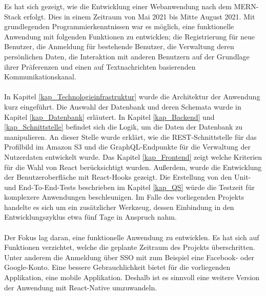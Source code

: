 Es hat sich gezeigt, wie die Entwicklung einer Webanwendung nach dem MERN-Stack erfolgt. Dies in einem Zeitraum von Mai 2021 bis Mitte August 2021. Mit grundlegenden Programmierkenntnissen war es möglich, eine funktionelle Anwendung mit folgenden Funktionen zu entwicklen; die Registrierung für neue Benutzer, die Anmeldung für bestehende Benutzer, die Verwaltung deren persönlichen Daten, die Interaktion mit anderen Benutzern auf der Grundlage ihrer Präferenzen und einen auf Textnachrichten basierenden Kommunikationskanal.
\\\\
In Kapitel \ref{kap_Technologieinfrastruktur} wurde die Architektur der Anwendung kurz eingeführt. %
Die Auswahl der Datenbank und deren Schemata wurde in Kapitel \ref{kap_Datenbank} erläutert. In Kapitel \ref{kap_Backend} und \ref{kap_Schnittstelle} befindet sich die Logik, um die Daten der Datenbank zu manipulieren. An dieser Stelle wurde erklärt, wie die REST-Schnittstelle für das Profilbild im Amazon S3 und die GraphQL-Endpunkte für die Verwaltung der Nutzerdaten entwickelt wurde.  
Das Kapitel \ref{kap_Frontend} zeigt welche Kriterien für die Wahl von React berücksichtigt wurden. Außerdem, wurde die Entwicklung der Benutzeroberfläche mit React-Hooks gezeigt. 
Die Erstellung von den Unit- und End-To-End-Tests beschrieben im Kapitel \ref{kap_QS} würde die Testzeit für komplexere Anwendungen beschleunigen. Im Falle des vorliegenden Projekts handelte es sich um ein zusätzlicher Werkzeug, dessen Einbindung in den Entwicklungszyklus etwa fünf Tage in Anspruch nahm. %
\\\\
Der Fokus lag daran, eine funktionelle Anwendung zu entwicklen. Es hat sich auf Funktionen verzichtet, welche die geplante Zeitraum des Projekts überschritten. Unter anderem die Anmeldung über SSO mit zum Beispiel eine Facebook- oder Google-Konto. %
Eine bessere Gebrauchlichkeit %
bietet für die vorliegenden Applikation, eine mobile Applikation. Deshalb ist es sinnvoll eine weitere Version der Anwendung mit React-Native umzuwandeln.